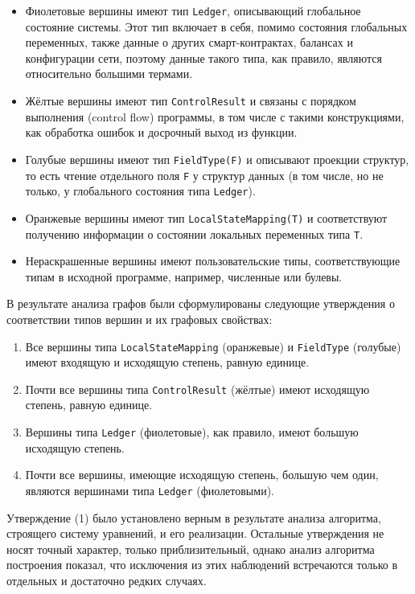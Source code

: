 \documentclass[../thesis.tex]{subfiles}
\begin{document}
\begin{itemize}
    \item Фиолетовые вершины имеют тип \texttt{Ledger}, описывающий глобальное состояние системы. Этот тип включает в себя, помимо состояния глобальных переменных, также данные о других смарт-контрактах, балансах и конфигурации сети, поэтому данные такого типа, как правило, являются относительно большими термами.
    \item Жёлтые вершины имеют тип \texttt{ControlResult} и связаны с порядком выполнения (control flow) программы, в том числе с такими конструкциями, как обработка ошибок и досрочный выход из функции.
    \item Голубые вершины имеют тип \texttt{FieldType(F)} и описывают проекции структур, то есть чтение отдельного поля \texttt{F} у структур данных (в том числе, но не только, у глобального состояния типа \texttt{Ledger}).
    \item Оранжевые вершины имеют тип \texttt{LocalStateMapping(T)} и соответствуют получению информации о состоянии локальных переменных типа \texttt{T}.
    \item Нераскрашенные вершины имеют пользовательские типы, соответствующие типам в исходной программе, например, численные или булевы.
\end{itemize}

В результате анализа графов были сформулированы следующие утверждения о соответствии типов вершин и их графовых свойствах:

\begin{enumerate}
    \item Все вершины типа \texttt{LocalStateMapping} (оранжевые) и \texttt{FieldType} (голубые) имеют входящую и исходящую степень, равную единице.
    \item Почти все вершины типа \texttt{ControlResult} (жёлтые) имеют исходящую степень, равную единице.
    \item Вершины типа \texttt{Ledger} (фиолетовые), как правило, имеют большую исходящую степень.
    \item Почти все вершины, имеющие исходящую степень, большую чем один, являются вершинами типа \texttt{Ledger} (фиолетовыми).
\end{enumerate}

Утверждение (1) было установлено верным в результате анализа алгоритма, строящего систему уравнений, и его реализации. Остальные утверждения не носят точный характер, только приблизительный, однако анализ алгоритма построения показал, что исключения из этих наблюдений встречаются только в отдельных и достаточно редких случаях.
\end{document}
